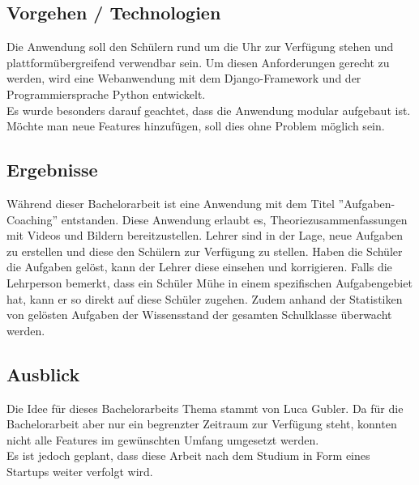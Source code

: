 

\subsection*{Vorgehen / Technologien}
Die Anwendung soll den Schülern rund um die Uhr zur Verfügung stehen und plattformübergreifend verwendbar sein. Um diesen Anforderungen gerecht zu werden, wird eine Webanwendung mit dem Django-Framework und der Programmiersprache Python entwickelt. \\
Es wurde besonders darauf geachtet, dass die Anwendung modular aufgebaut ist. Möchte man neue Features hinzufügen, soll dies ohne Problem möglich sein.

\subsection*{Ergebnisse}
Während dieser Bachelorarbeit ist eine Anwendung mit dem Titel ''Aufgaben-Coaching'' entstanden. Diese Anwendung erlaubt es, Theoriezusammenfassungen mit Videos und Bildern bereitzustellen. Lehrer sind in der Lage, neue Aufgaben zu erstellen und diese den Schülern zur Verfügung zu stellen. Haben die Schüler die Aufgaben gelöst, kann der Lehrer diese einsehen und korrigieren. Falls die Lehrperson bemerkt, dass ein Schüler Mühe in einem spezifischen Aufgabengebiet hat, kann er so direkt auf diese Schüler zugehen. Zudem anhand der Statistiken von gelösten Aufgaben der Wissensstand der gesamten Schulklasse überwacht werden.

\subsection*{Ausblick}
Die Idee für dieses Bachelorarbeits Thema stammt von Luca Gubler. Da für die Bachelorarbeit aber nur ein begrenzter Zeitraum zur Verfügung steht, konnten nicht alle Features im gewünschten Umfang umgesetzt werden. \\

Es ist jedoch geplant, dass diese Arbeit nach dem Studium in Form eines Startups weiter verfolgt wird.


\newpage